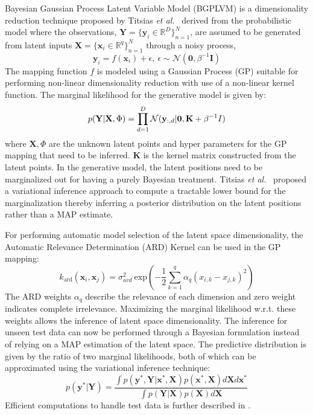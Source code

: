 \documentclass{article}
\begin{document}
Bayesian Gaussian Process Latent Variable Model (BGPLVM) is a dimensionality reduction technique proposed by Titsias \emph{et al.}~\cite{bgplvm}  derived from the probabilistic model where the observations, $\mathbf{Y} = \{\mathbf{y}_{i} \in \mathbb{R}^D\}_{n=1}^N$, are assumed to be generated from latent inputs $\mathbf{X} = \{\mathbf{x}_{i} \in \mathbb{R}^q\}_{n=1}^N$ through a noisy process,
\begin{equation}
  \mathbf{y}_i = f(\mathbf{x}_i) + \epsilon,~\epsilon \sim \mathcal{N}(\mathbf{0},\beta^{-1}\mathbf{I})
\end{equation}
The mapping function $f$ is modeled using a Gaussian Process (GP) suitable for performing non-linear dimensionality reduction with use of a non-linear kernel function. The marginal likelihood for the generative model is given by:
\begin{equation}
  \label{eqn:marginallikelihood}
  p(\mathbf{Y}|\mathbf{X},\Phi) = \prod_{d=1}^{D} \mathcal{N}(\mathbf{y}_{:,d}|\mathbf{0},\mathbf{K}+\beta^{-1}I)\\
\end{equation}
where $\mathbf{X},\Phi$ are the unknown latent points and hyper parameters for the GP mapping that need to be inferred. $\mathbf{K}$ is the kernel matrix constructed from the latent points. In the generative model, the latent positions need to be marginalized out for having a purely Bayesian treatment. Titsias \emph{et al.}~\cite{bgplvm} proposed a variational inference approach to compute a tractable lower bound for the marginalization thereby inferring a posterior distribution on the latent positions rather than a MAP estimate.

For performing automatic model selection of the latent space dimensionality, the Automatic Relevance Determination (ARD) Kernel can be used in the GP mapping:
\begin{equation}
  \label{eqn:ardkernel}
  k_{\text{ard}}(\mathbf{x}_i,\mathbf{x}_j) = \sigma_{ard}^2~\text{exp}\left( - \frac{1}{2} \sum_{k=1}^q{\alpha_q (x_{i,k} - x_{j,k})^2}\right)
\end{equation}
The ARD weights $\alpha_q$ describe the relevance of each dimension and zero weight indicates complete irrelevance. Maximizing the marginal likelihood w.r.t. these weights allows the inference of latent space dimensionality. The inference for unseen test data can now be performed through a Bayesian formulation instead of relying on a MAP estimation of the latent space. The predictive distribution is given by the ratio of two marginal likelihoods, both of which can be approximated using the variational inference technique:
\begin{equation}
	\label{eqn:testinference}
	p(\mathbf{y}^*|\mathbf{Y}) = \frac{\int p(\mathbf{y}^*,\mathbf{Y}|\mathbf{x}^*,\mathbf{X})p(\mathbf{x}^*,\mathbf{X})d\mathbf{X}d\mathbf{x}^*}{\int p(\mathbf{Y}|\mathbf{X})p(\mathbf{X})d\mathbf{X}}
\end{equation}
Efficient computations to handle test data is further described in \cite{bgplvm}.
\end{document}
